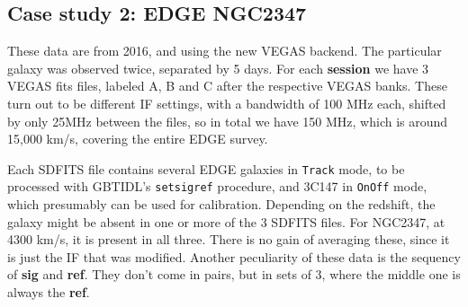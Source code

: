 \documentclass[12pt,a4paper]{article}
\begin{document}
\subsection{Case study 2: EDGE NGC2347}

These data are from 2016, and using the new VEGAS backend. The
particular galaxy was observed twice, separated by 5 days. For each
{\bf session} we have 3 VEGAS fits files, labeled A, B and C after the
respective VEGAS banks. These
turn out to be different IF settings, with a bandwidth of 100 MHz
each, shifted by only 25MHz between the files, so in total we have 150
MHz, which is around 15,000 km/s, covering the entire EDGE survey.

Each SDFITS file contains several EDGE galaxies in {\tt Track}
mode, to be processed with GBTIDL's {\tt setsigref} procedure,
and 3C147 in {\tt OnOff} mode, which presumably can be used for
calibration.  Depending on the redshift, the galaxy might be absent in one
or more of the 3 SDFITS files. For NGC2347, at 4300 km/s, it is present
in all three. There is no gain of averaging these, since it is just the IF
that was modified. Another peculiarity of these data is the sequency of {\bf sig}
and {\bf ref}. They don't come in pairs, but in sets of 3, where the middle one
is always the {\bf ref}.
\end{document}
